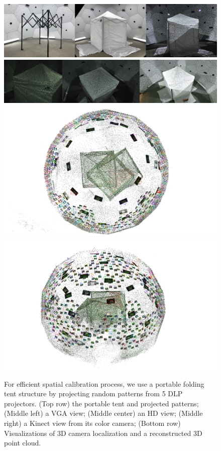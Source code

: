 \begin{figure}
	\centering
	\includegraphics[width=\linewidth]{fig_system/cali_tent_3rdViews}\\
	\vspace{0.2cm}
	\includegraphics[width=\linewidth]{fig_system/cali_tent_camViews}\\
	\includegraphics[trim=70 0 70 0,clip,width=0.45\columnwidth]{figures/domeCalib/38}  
	\includegraphics[trim=60 0 80 0,clip,width=0.45\columnwidth]{figures/domeCalib/39}  
	\caption{For efficient spatial calibration process, we use a portable folding tent structure by projecting random patterns from 5 DLP projectors. (Top row) the portable tent and projected patterns; (Middle left) a VGA view; (Middle center) an HD view; (Middle right) a Kinect view from its color camera; (Bottom row) Visualizations of 3D camera localization and a reconstructed 3D point cloud.} 
	\label{fig:spatialCalibration}
\end{figure}

